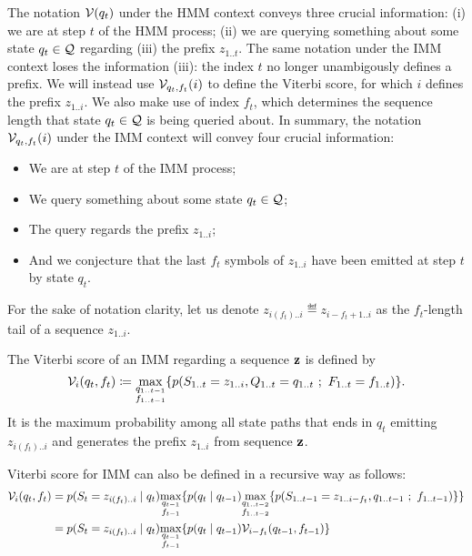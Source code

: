 The notation $\mathcal{V}(q_t)$ under the HMM context conveys three crucial information: (i) we are at
step $t$ of the HMM process; (ii) we are querying something about some state $q_t \in \mathcal{Q}$
regarding (iii) the prefix $z_{1..t}$. The same notation under the IMM context loses the information
(iii): the index $t$ no longer unambigously defines a prefix. We will instead use
$\mathcal{V}_{q_t,f_t}(i)$ to define the Viterbi score, for which $i$ defines the prefix $z_{1..i}$. We
also make use of index $f_t$, which determines the sequence length that state $q_t \in \mathcal{Q}$ is
being queried about.
In summary, the notation $\mathcal{V}_{q_t,f_t}(i)$ under the IMM context will convey four crucial
information:
\begin{itemize}
  \item We are at step $t$ of the IMM process;
  \item We query something about some state $q_t \in \mathcal{Q}$;
  \item The query regards the prefix $z_{1..i}$;
  \item And we conjecture that the last $f_t$ symbols of $z_{1..i}$ have been emitted at step $t$ by
    state $q_t$.
\end{itemize}
For the sake of notation clarity, let us denote $z_{i(f_t)..i} \eqdef z_{i-f_t+1..i}$ as the
$f_t$-length tail of a sequence $z_{1..i}$.

The Viterbi score of an IMM regarding a sequence $\mathbf{z}$ is defined by
\begin{equation*}
  \mathcal{V}_{i}(q_t,f_t) \coloneqq \underset{\substack{q_{1..t-1}\\f_{1..t-1}}}{\max}
    \{ p(S_{1..t}=z_{1..i}, Q_{1..t}=q_{1..t} ~;~ F_{1..t}=f_{1..t}) \}.
\end{equation*}
It is the maximum probability among all state paths that ends in
$q_t$ emitting $z_{i(f_t)..i}$ and generates the prefix $z_{1..i}$ from sequence $\mathbf{z}$.

Viterbi score for IMM can also be defined in a recursive way as follows:
\begin{equation*}
  \begin{split}
    \mathcal{V}_{i}(q_t,f_t)
    &= p(S_t=z_{i(f_t)..i} \;|\; q_t)
      \underset{\substack{q_{t-1}\\f_{t-1}}}{\max}
      \{
        p(q_t \;|\; q_{t-1})
        \underset{\substack{q_{1..t-2}\\f_{1..t-2}}}{\max}
        \{
          p(S_{1..t-1}=z_{1..i-f_t}, q_{1..t-1} ~;~ f_{1..t-1})
        \}
      \}\\
    &= p(S_t=z_{i(f_t)..i} \;|\; q_t)
      \underset{\substack{q_{t-1}\\f_{t-1}}}{\max}
      \{
        p(q_t \;|\; q_{t-1}) \mathcal{V}_{i-f_t}(q_{t-1},f_{t-1})
      \}
  \end{split}
\end{equation*}

